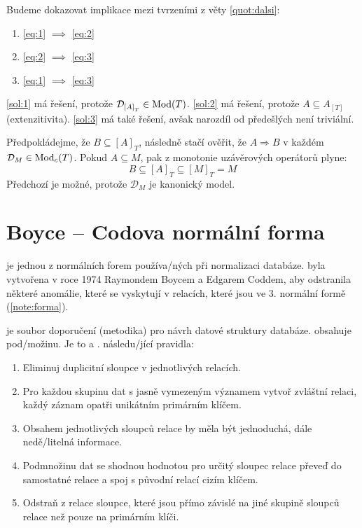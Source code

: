 \begin{upproof}
Budeme dokazovat implikace mezi tvrzeními z věty \ref{quot:dalsi}:
\begin{enumerate}
\item\label{sol:1} \ref{eq:1} $\implies$ \ref{eq:2}
\item\label{sol:2} \ref{eq:2} $\implies$ \ref{eq:3}
\item\label{sol:3} \ref{eq:1} $\implies$ \ref{eq:3}
\end{enumerate}
\ref{sol:1} má řešení, protože $\mathcal{D}_{\left[ A \right]_{T}} \in \operatorname{Mod}(T)$. \ref{sol:2} má řešení, protože $A \subseteq A_{\left[ T \right]}$ (extenzitivita). \ref{sol:3} má také řešení, avšak narozdíl od předešlých není triviální.

Předpokládejme, že $B \subseteq \left[ A \right]_{T}$, následně stačí ověřit, že $A \Rightarrow B$ v každém $\mathcal{D}_{M} \in \operatorname{Mod}_{c}(T)$. Pokud $A \subseteq M$, pak z monotonie uzávěrových operátorů plyne:
$$
B \subseteq \left[ A \right]_{T} \subseteq \left[ M \right]_{T} = M
$$
Předchozí je možné, protože $\mathcal{D}_{M}$ je kanonický model.
\end{upproof}

\section{Boyce -- Codova normální forma}
 je jednou z normálních forem používa\-/ných při normalizaci databáze.  byla vytvořena v roce 1974 Raymondem Boycem a Edgarem Coddem, aby odstranila některé anomálie, které se vyskytují v relacích, které jsou ve $3.$ normální formě (\ref{note:forma}).

\begin{upnote}\label{note:forma}
 je soubor doporučení (metodika) pro návrh datové struktury databáze.  obsahuje pod\-/možinu. Je to  a .  následu\-/jící pravidla:
\begin{enumerate}
\item Eliminuj duplicitní sloupce v jednotlivých relacích.
\item Pro každou skupinu dat s jasně vymezeným významem vytvoř zvláštní relaci, každý záznam opatři unikátním primárním klíčem.
\item Obsahem jednotlivých sloupců relace by měla být jednoduchá, dále nedě\-/litelná informace.
\item Podmnožinu dat se shodnou hodnotou pro určitý sloupec relace převeď do samostatné relace a spoj s původní relací cizím klíčem.
\item Odstraň z relace sloupce, které jsou přímo závislé na jiné skupině sloupců relace než pouze na primárním klíči.
\end{enumerate}
\end{upnote}

